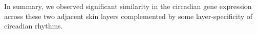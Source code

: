 In summary, we observed significant similarity in the circadian gene expression across these two adjacent skin layers complemented by some layer-specificity of circadian rhythms. 



